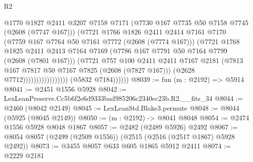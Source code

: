 \begin{lexlean}{R2}
\begin{coremodule}
                                        @1770
                                        @1827
                                        @2411
                                        @3207
                                        @7158
                                        @7171
                                        (@7730 @167 @7735 @50 @7158 @7745 (@2608 (@7747 @167)))
                                        (@7721
                                          @1766
                                          @1826
                                          @2411
                                          @2414
                                          @7161
                                          @7170
                                          (@7759 @167 @7764 @50 @7161 @7772 (@2608 (@7774 @167)))
                                          (@7721
                                            @1768
                                            @1825
                                            @2411
                                            @2413
                                            @7164
                                            @7169
                                            (@7786 @167 @7791 @50 @7164 @7799 (@2608 (@7801 @167)))
                                            (@7721
                                              @757
                                              @100
                                              @2411
                                              @2411
                                              @7167
                                              @2181
                                              (@7813
                                                @167
                                                @7817
                                                @50
                                                @7167
                                                @7825
                                                (@2608 (@7827 @167)))
                                              (@2628 @7712)))))))))))))))))
              (@5832 @7184))))))
@8039 := fun (m : @2192) => @5914
@8041 := @2451 @1556 @5928
@8042 := LexLeanPreserve.Cc5b6f2e6d9333bad985206c2340ec23b.R2.__fits_34
@8044 := @2460 (@8042 @2149)
@8045 := LexLeanStd.Blake3.permute
@8048 := @8044 (@5925 (@8045 @2149))
@8050 := (m : @2192) -> @8041 @8048
@8054 := @2474 @1556 @5928 @8048 @1867
@8057 := @2482 (@2489 @5926) @2492
@8067 := @8054 @8057 (@2499 (@2509 @1556)) (@2515 (@2516 (@2517 @1867) @5928 @2492))
@8073 := @3455 @8057 @633 @605 @1865 @5912 @2411
@8074 := @2229 @2181

\end{coremodule}
\end{lexlean}

